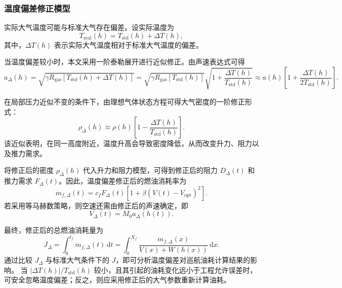 \documentclass[UTF8]{ctexart}
\begin{document}
\subsubsection{温度偏差修正模型}

实际大气温度可能与标准大气存在偏差。设实际温度为
\begin{equation}
    T_{\mathrm{real}}(h)
    =
    T_{\mathrm{std}}(h)+\Delta T(h),
    \label{eq:q2_T_real}
\end{equation}
其中，$\Delta T(h)$ 表示实际大气温度相对于标准大气温度的偏差。

当温度偏差较小时，本文采用一阶泰勒展开进行近似修正。由声速表达式可得
\begin{equation}
    a_{\Delta}(h)
    =
    \sqrt{\gamma R_{\mathrm{gas}}\left[T_{\mathrm{std}}(h)+\Delta T(h)\right]}
    =
    \sqrt{\gamma R_{\mathrm{gas}}\left[T_{\mathrm{std}}(h)\right]}\sqrt{1+\frac{\Delta T(h)}{T_{\mathrm{std}}(h)}}
    \approx
    a(h)
    \left[
    1+\frac{\Delta T(h)}{2T_{\mathrm{std}}(h)}
    \right].
    \label{eq:q2_a_delta}
\end{equation}

在局部压力近似不变的条件下，由理想气体状态方程可得大气密度的一阶修正形式：
\begin{equation}
    \rho_{\Delta}(h)
    \approx
    \rho(h)
    \left[
    1-\frac{\Delta T(h)}{T_{\mathrm{std}}(h)}
    \right].
    \label{eq:q2_rho_delta}
\end{equation}
该近似表明，在同一高度附近，温度升高会导致密度降低，从而改变升力、阻力以及推力需求。

将修正后的密度 $\rho_{\Delta}(h)$ 代入升力和阻力模型，可得到修正后的阻力
$D_{\Delta}(t)$ 和推力需求 $F_{\Delta}(t)$。因此，温度偏差修正后的燃油消耗率为
\begin{equation}
    \dot m_{f,\Delta}(t)
    =
    c_fF_{\Delta}(t)
    \left[
    1+\beta\left(V(t)-V_{\mathrm{opt}}\right)^2
    \right].
    \label{eq:q2_fuel_delta}
\end{equation}
若采用等马赫数策略，则空速还需由修正后的声速确定，即
\begin{equation}
    V_{\Delta}(t)=M_0a_{\Delta}(h(t)).
    \label{eq:q2_V_delta}
\end{equation}

最终，修正后的总燃油消耗量为
\begin{equation}
    J_{\Delta}
    =
    \int_{0}^{t_f}\dot m_{f,\Delta}(t)\,\mathrm{d}t
    =
    \int_{0}^{X_f}
    \frac{\dot m_{f,\Delta}(x)}{V(x)+W(h(x))}\,\mathrm{d}x.
    \label{eq:q2_total_delta}
\end{equation}
通过比较 $J_{\Delta}$ 与标准大气条件下的 $J$，即可分析温度偏差对巡航油耗计算结果的影响。
当 $\left|\Delta T(h)\right|/T_{\mathrm{std}}(h)$ 较小，且其引起的油耗变化远小于工程允许误差时，
可安全忽略温度偏差；反之，则应采用修正后的大气参数重新计算油耗。
\end{document}

